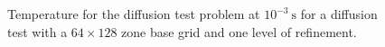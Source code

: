 \documentclass[preprint,times,tighten]{aastex63}
\begin{document}
\begin{figure}[t]
\centering
{}
\caption{\label{fig:diffusion} Temperature for the diffusion test problem at $10^{-3}~\mbox{s}$
for a diffusion test with a $64\times 128$ zone base grid and one level of refinement.}
\end{figure}





\end{document}
